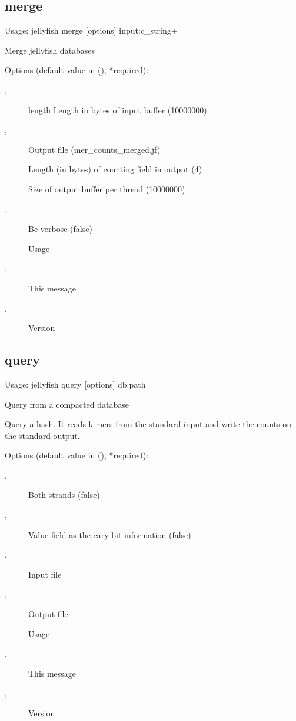 \subsection{merge}
\noindent Usage: jellyfish merge [options] input:c\_string+

\noindent Merge jellyfish databases

\noindent Options (default value in (), *required):
\begin{description}
\item[,] \noindent length          Length in bytes of input buffer (10000000)
\item[,] \noindent Output file (mer\_counts\_merged.jf)
\item[] \noindent Length (in bytes) of counting field in output (4)
\item[] \noindent Size of output buffer per thread (10000000)
\item[,] \noindent Be verbose (false)
\item[] \noindent Usage
\item[,] \noindent This message
\item[,] \noindent Version
\end{description}
\subsection{query}
\noindent Usage: jellyfish query [options] db:path

\noindent Query from a compacted database

\noindent Query a hash. It reads k-mers from the standard input and write the counts on the standard output.

\noindent Options (default value in (), *required):
\begin{description}
\item[,] \noindent Both strands (false)
\item[,] \noindent Value field as the cary bit information (false)
\item[,] \noindent Input file
\item[,] \noindent Output file
\item[] \noindent Usage
\item[,] \noindent This message
\item[,] \noindent Version
\end{description}
